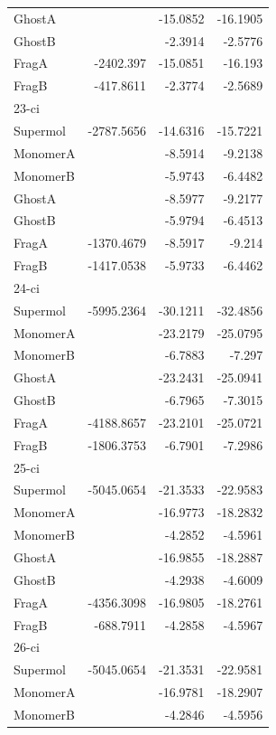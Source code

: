 \documentclass[journal=jctcce,manuscript=article]{achemso}
\begin{document}
\begin{spacing}{1}
\begin{longtable}{lRRR}
    GhostA &       & -15.0852 & -16.1905 \\
    GhostB &       & -2.3914 & -2.5776 \\
    FragA & -2402.397 & -15.0851 & -16.193 \\
    FragB & -417.8611 & -2.3774 & -2.5689 \\
    23-ci &       &       &  \\
    Supermol & -2787.5656 & -14.6316 & -15.7221 \\
    MonomerA &       & -8.5914 & -9.2138 \\
    MonomerB &       & -5.9743 & -6.4482 \\
    GhostA &       & -8.5977 & -9.2177 \\
    GhostB &       & -5.9794 & -6.4513 \\
    FragA & -1370.4679 & -8.5917 & -9.214 \\
    FragB & -1417.0538 & -5.9733 & -6.4462 \\
    24-ci &       &       &  \\
    Supermol & -5995.2364 & -30.1211 & -32.4856 \\
    MonomerA &       & -23.2179 & -25.0795 \\
    MonomerB &       & -6.7883 & -7.297 \\
    GhostA &       & -23.2431 & -25.0941 \\
    GhostB &       & -6.7965 & -7.3015 \\
    FragA & -4188.8657 & -23.2101 & -25.0721 \\
    FragB & -1806.3753 & -6.7901 & -7.2986 \\
    25-ci &       &       &  \\
    Supermol & -5045.0654 & -21.3533 & -22.9583 \\
    MonomerA &       & -16.9773 & -18.2832 \\
    MonomerB &       & -4.2852 & -4.5961 \\
    GhostA &       & -16.9855 & -18.2887 \\
    GhostB &       & -4.2938 & -4.6009 \\
    FragA & -4356.3098 & -16.9805 & -18.2761 \\
    FragB & -688.7911 & -4.2858 & -4.5967 \\
    26-ci &       &       &  \\
    Supermol & -5045.0654 & -21.3531 & -22.9581 \\
    MonomerA &       & -16.9781 & -18.2907 \\
    MonomerB &       & -4.2846 & -4.5956 \\

\end{longtable}
\end{spacing}
\end{document}
